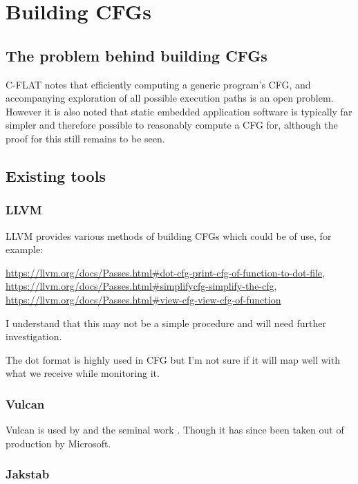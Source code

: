\section{Building CFGs}

\subsection{The problem behind building CFGs}

C-FLAT \cite{Abera2016} notes that efficiently computing a generic program's CFG, and accompanying exploration of all possible execution paths is an open problem. However it is also noted that static embedded application software is typically far simpler and therefore possible to reasonably compute a CFG for, although the proof for this still remains to be seen.

\subsection{Existing tools}

\subsubsection{LLVM}

LLVM provides various methods of building CFGs which could be of use, for example:

\url{https://llvm.org/docs/Passes.html#dot-cfg-print-cfg-of-function-to-dot-file},
\url{https://llvm.org/docs/Passes.html#simplifycfg-simplify-the-cfg},
\url{https://llvm.org/docs/Passes.html#view-cfg-view-cfg-of-function}

I understand that this may not be a simple procedure and will need further investigation.

The dot format is highly used in CFG but I'm not sure if it will map well with what we receive while monitoring it.

\subsubsection{Vulcan}

Vulcan \cite{Edwards2001} is used by \cite{Davi2012} and the seminal work \cite{Abadi2005}. Though it has since been taken out of production by Microsoft.

\subsubsection{Jakstab}

